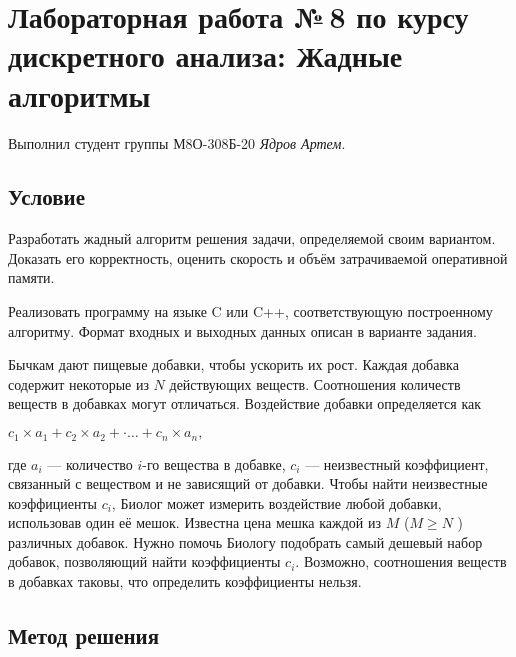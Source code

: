 \documentclass[12pt]{article}
\begin{document}
	
	\section*{Лабораторная работа №\,8 по курсу дискретного анализа: Жадные алгоритмы}
	
	Выполнил студент группы М8О-308Б-20 \textit{Ядров Артем}.
	
	\subsection*{Условие}
	Разработать жадный алгоритм решения задачи, определяемой своим
	вариантом. Доказать его корректность, оценить скорость и объём
	затрачиваемой оперативной памяти.
	
	Реализовать программу на языке C или C++, соответствующую
	построенному алгоритму. Формат входных и выходных данных описан в
	варианте задания.
	
	Бычкам дают пищевые добавки, чтобы ускорить их рост. Каждая добавка
	содержит некоторые из $N$ действующих веществ. Соотношения количеств веществ в добавках могут отличаться. Воздействие добавки
	определяется как
	
	$c_1\times a_1 + c_2 \times a_2 +·\ldots +c_n \times a_n,$
	
	где $a_i$ — количество $i$-го вещества в добавке, $c_i$ — неизвестный
	коэффициент, связанный с веществом и не зависящий от добавки. Чтобы
	найти неизвестные коэффициенты $c_i$, Биолог может измерить
	воздействие любой добавки, использовав один её мешок. Известна цена
	мешка каждой из $M$ ($M \geq N$ ) различных добавок. Нужно помочь Биологу
	подобрать самый дешевый набор добавок, позволяющий найти
	коэффициенты $c_i$. Возможно, соотношения веществ в добавках таковы,
	что определить коэффициенты нельзя.
	
	\subsection*{Метод решения}
	
\end{document}
